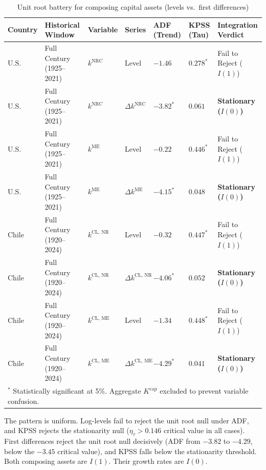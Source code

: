 \documentclass[11pt,a4paper]{article}
\begin{document}
\begin{table}[h!]
\centering
\small
\caption{Unit root battery for composing capital assets (levels vs.\ first differences)}
\label{tab:unit_root_summary}
\begin{tabular}{p{1.4cm} p{3.4cm} p{1.6cm} p{1.6cm} p{1.6cm} p{1.4cm} p{2.8cm}}
\toprule
\textbf{Country} & \textbf{Historical Window} & \textbf{Variable} & \textbf{Series} & \textbf{ADF (Trend)} & \textbf{KPSS (Tau)} & \textbf{Integration Verdict} \\
\midrule
U.S. & Full Century (1925--2021) & $k^{\text{NRC}}$ & Level & $-1.46$ & $0.278^*$ & Fail to Reject ($I(1)$) \\
U.S. & Full Century (1925--2021) & $k^{\text{NRC}}$ & $\Delta k^{\text{NRC}}$ & $-3.82^*$ & $0.061$ & \textbf{Stationary ($I(0)$)} \\
U.S. & Full Century (1925--2021) & $k^{\text{ME}}$ & Level & $-0.22$ & $0.446^*$ & Fail to Reject ($I(1)$) \\
U.S. & Full Century (1925--2021) & $k^{\text{ME}}$ & $\Delta k^{\text{ME}}$ & $-4.15^*$ & $0.048$ & \textbf{Stationary ($I(0)$)} \\
\midrule
Chile & Full Century (1920--2024) & $k^{\text{CL, NR}}$ & Level & $-0.32$ & $0.447^*$ & Fail to Reject ($I(1)$) \\
Chile & Full Century (1920--2024) & $k^{\text{CL, NR}}$ & $\Delta k^{\text{CL, NR}}$ & $-4.06^*$ & $0.052$ & \textbf{Stationary ($I(0)$)} \\
Chile & Full Century (1920--2024) & $k^{\text{CL, ME}}$ & Level & $-1.34$ & $0.448^*$ & Fail to Reject ($I(1)$) \\
Chile & Full Century (1920--2024) & $k^{\text{CL, ME}}$ & $\Delta k^{\text{CL, ME}}$ & $-4.29^*$ & $0.041$ & \textbf{Stationary ($I(0)$)} \\
\bottomrule
\multicolumn{7}{p{13.8cm}}{\footnotesize $^*$ Statistically significant at 5\%. Aggregate $K^{\text{cap}}$ excluded to prevent variable confusion.}
\end{tabular}
\end{table}

The pattern is uniform. Log-levels fail to reject the unit root null under ADF, and KPSS rejects the stationarity null ($\eta_\tau > 0.146$ critical value in all cases). First differences reject the unit root null decisively (ADF from $-3.82$ to $-4.29$, below the $-3.45$ critical value), and KPSS falls below the stationarity threshold. Both composing assets are $I(1)$. Their growth rates are $I(0)$.
\end{document}
